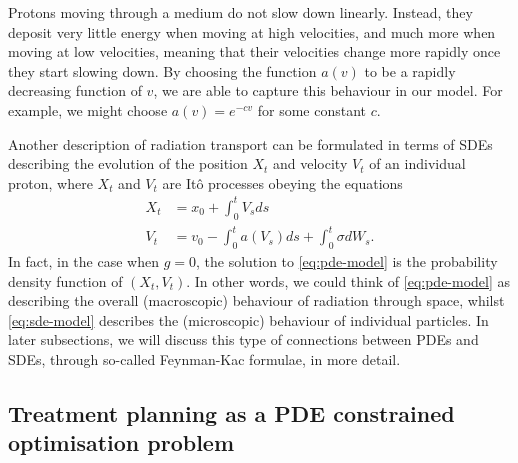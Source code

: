 Protons moving through a medium do not slow down linearly. Instead, they deposit very little energy when moving at high velocities, and much more when moving at low velocities, meaning that their velocities change more rapidly once they start slowing down. By choosing the function $a(v)$ to be a rapidly decreasing function of $v$, we are able to capture this behaviour in our model. For example, we might choose $a(v) = e^{-cv}$ for some constant $c$.

Another description of radiation transport can be formulated in terms of SDEs describing the evolution of the position $X_t$ and velocity $V_t$ of an individual proton, where $X_t$ and $V_t$ are Itô processes obeying the equations
%
\begin{align} 
    \label{eq:sde-model}
    X_t &= x_0 + \int_{0}^{t} V_s ds\\ 
    V_t &= v_0 - \int_{0}^{t} a(V_s) ds + \int_{0}^{t} \sigma dW_s.
\end{align}
%
In fact, in the case when $g=0$, the solution to \autoref{eq:pde-model} is the probability density function of $(X_t,V_t)$. In other words, we could think of \autoref{eq:pde-model} as describing the overall (macroscopic) behaviour of radiation through space, whilst \autoref{eq:sde-model} describes the (microscopic) behaviour of individual particles. In later subsections, we will discuss this type of connections between PDEs and SDEs, through so-called Feynman-Kac formulae, in more detail.

\subsection{Treatment planning as a PDE constrained optimisation problem}









